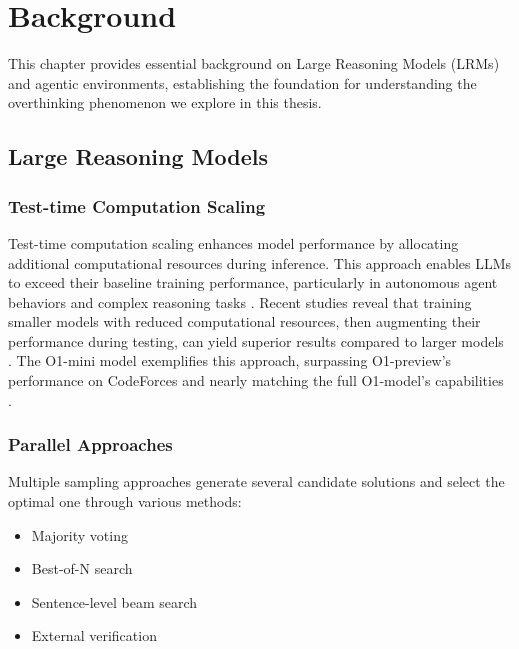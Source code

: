 \chapter{Background}
\label{background}

This chapter provides essential background on Large Reasoning Models (LRMs) and agentic environments, establishing the foundation for understanding the overthinking phenomenon we explore in this thesis.

\section{Large Reasoning Models}
\label{sec:lrm}

\subsection{Test-time Computation Scaling}
Test-time computation scaling enhances model performance by allocating additional computational resources during inference. This approach enables LLMs to exceed their baseline training performance, particularly in autonomous agent behaviors and complex reasoning tasks \cite{qu2024recursiveintrospectionteachinglanguage, singh2024humandatascalingselftraining, wei2023chainofthoughtpromptingelicitsreasoning}. Recent studies reveal that training smaller models with reduced computational resources, then augmenting their performance during testing, can yield superior results compared to larger models \cite{snell2024scalingllmtesttimecompute, wu2024inferencescalinglawsempirical}. The O1-mini model exemplifies this approach, surpassing O1-preview's performance on CodeForces \cite{codeforces} and nearly matching the full O1-model's capabilities \cite{openai_learning_to_reason_2024, openai_O1_mini}.

\subsection{Parallel Approaches}
Multiple sampling approaches generate several candidate solutions and select the optimal one through various methods:
\begin{itemize}
    \item Majority voting \cite{huang2022largelanguagemodelsselfimprove}
    \item Best-of-N search \cite{amini2024variationalbestofnalignment}
    \item Sentence-level beam search \cite{graves2012sequencetransductionrecurrentneural}
    \item External verification \cite{lee2024prometheusvisionvisionlanguagemodeljudge, xiong2024llavacriticlearningevaluatemultimodal, brown2024largelanguagemonkeysscaling}
\end{itemize}

